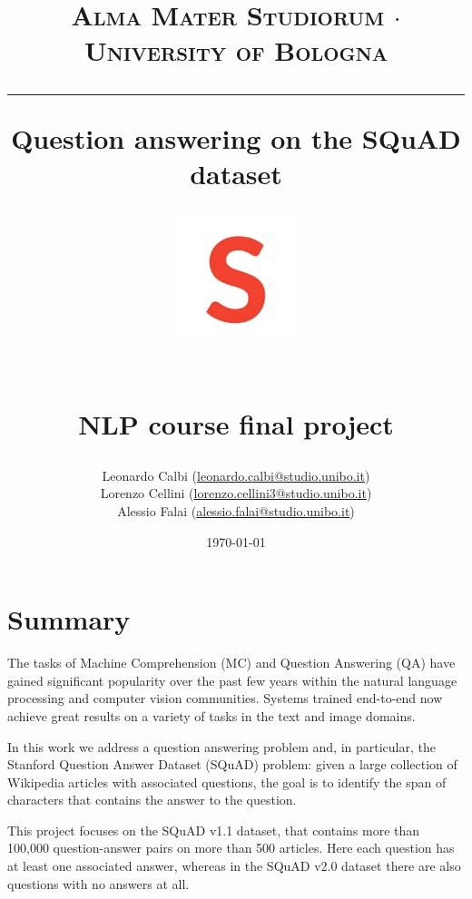 \documentclass[a4paper,10pt]{report}
\begin{document}
\frenchspacing

\title{
  {{\large{\textsc{Alma Mater Studiorum $\cdot$ University of Bologna}}}}
  \rule{\textwidth}{0.4pt}\vspace{3mm}
  \textbf{Question answering on the SQuAD dataset}
  \begin{figure}[!htb]
    \centering
    \includegraphics[width = 100pt]{squad-logo}
  \end{figure} \\
  NLP course final project
}

\author{Leonardo Calbi (\href{mailto:leonardo.calbi@studio.unibo.it}{leonardo.calbi@studio.unibo.it}) \\ Lorenzo Cellini (\href{mailto:lorenzo.cellini3@studio.unibo.it}{lorenzo.cellini3@studio.unibo.it}) \\ Alessio Falai (\href{mailto:alessio.falai@studio.unibo.it}{alessio.falai@studio.unibo.it})}
\date{\today}
\maketitle
\newpage
\tableofcontents
\setcounter{tocdepth}{1}
\newpage


\chapter{Summary}\label{chap:introduction}

The tasks of Machine Comprehension (MC) and Question Answering (QA) have gained significant popularity over the past few years within the natural language processing and computer vision communities. Systems trained end-to-end now achieve great results on a variety of tasks in the text and image domains.

In this work we address a question answering problem and, in particular, the Stanford Question Answer Dataset (SQuAD) problem: given a large collection of Wikipedia articles with associated questions, the goal is to identify the span of characters that contains the answer to the question.

This project focuses on the SQuAD v1.1 dataset, that contains more than 100,000 question-answer pairs on more than 500 articles. Here each question has at least one associated answer, whereas in the SQuAD v2.0 dataset there are also questions with no answers at all.
\end{document}
